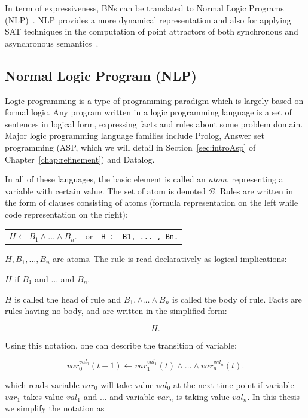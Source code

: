 In term of expressiveness, BNs can be translated to Normal Logic Programs (NLP)~\cite{inoue2011logic}.
NLP provides a more dynamical representation and also for applying SAT techniques in the computation of point attractors of both synchronous and asynchronous semantics~\cite{dubrova2011sat,harvey1997time}.

\subsection{Normal Logic Program (NLP)}\label{sec:logicProgram}
Logic programming is a type of programming paradigm which is largely based on formal logic.
Any program written in a logic programming language is a set of sentences in logical form, expressing facts and rules about some problem domain.
Major logic programming language families include Prolog, Answer set programming (ASP, which we will detail in Section~\ref{sec:introAsp} of Chapter~\ref{chap:refinement}) and Datalog.

In all of these languages, the basic element is called an \textit{atom}, representing a variable with certain value.
The set of atom is denoted $\mathcal{B}$.
Rules are written in the form of clauses consisting of atoms (formula representation on the left while code representation on the right):

\begin{table}[ht]
    \centering
    \begin{tabular}{ccc}
        $H \gets B_1\land\ldots\land B_n.$  & or & \texttt{H :- B1, ... , Bn.}
    \end{tabular}
\end{table}

$H,B_1,\ldots,B_n$ are atoms. 
The rule is read declaratively as logical implications:

\begin{center}
    $H$ if $B_1$ and $\ldots$ and $B_n$.
\end{center}

$H$ is called the head of rule and $B_1,\land\ldots\land B_n$ is called the body of rule.
Facts are rules having no body, and are written in the simplified form:

$$H.$$

Using this notation, one can describe the transition of variable:

    $$var_0^{val_0}(t+1) \gets var_1^{val_1}(t)\land \ldots \land var_n^{val_n}(t).$$
    
which reads variable $var_0$ will take value $val_0$ at the next time point if variable $var_1$ takes value $val_1$ and $\ldots$ and variable $var_n$ is taking value $val_n$.
In this thesis we simplify the notation as 

